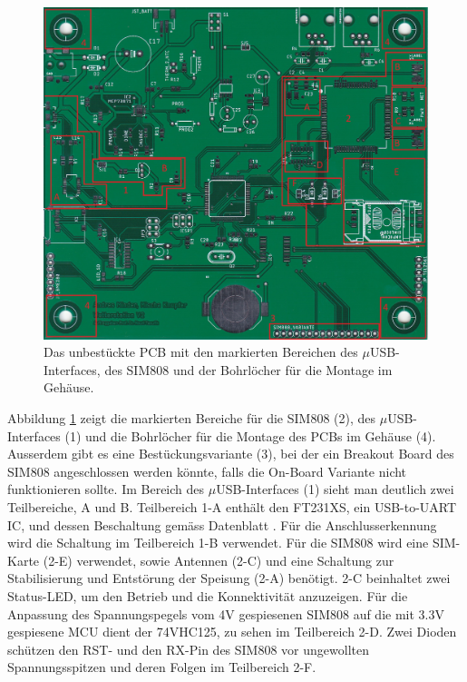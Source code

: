 \begin{figure}[h]
\centering
\includegraphics[width=0.99\linewidth]{graphics/HW_Uebersicht/PCB_USB_SIM808.jpg}
\caption{Das unbestückte PCB mit den markierten Bereichen des $\mu$USB-Interfaces, des SIM808 und der Bohrlöcher für die Montage im Gehäuse.}
\label{fig:Uebersicht_PCB_USB_SIM}
\end{figure}
Abbildung \ref{fig:Uebersicht_PCB_USB_SIM} zeigt die markierten Bereiche für die SIM808 (2), des $\mu$USB-Interfaces (1) und die Bohrlöcher für die Montage des PCBs im Gehäuse (4). Ausserdem gibt es eine Bestückungsvariante (3), bei der ein Breakout Board des SIM808 angeschlossen werden könnte, falls die On-Board Variante nicht funktionieren sollte. Im Bereich des $\mu$USB-Interfaces (1) sieht man deutlich zwei Teilbereiche, A und B. Teilbereich 1-A enthält den FT231XS, ein USB-to-UART IC, und dessen Beschaltung gemäss Datenblatt \cite{FTDI}. Für die Anschlusserkennung wird die Schaltung im Teilbereich 1-B verwendet. Für die SIM808 wird eine SIM-Karte (2-E) verwendet, sowie Antennen (2-C) und eine Schaltung zur Stabilisierung und Entstörung der Speisung (2-A) benötigt. 2-C beinhaltet zwei Status-LED, um den Betrieb und die Konnektivität anzuzeigen. Für die Anpassung des Spannungspegels vom 4V gespiesenen SIM808 auf die mit 3.3V gespiesene MCU dient der 74VHC125, zu sehen im Teilbereich 2-D. Zwei Dioden schützen den RST- und den RX-Pin des SIM808 vor ungewollten Spannungsspitzen und deren Folgen im Teilbereich 2-F.
\newpage

